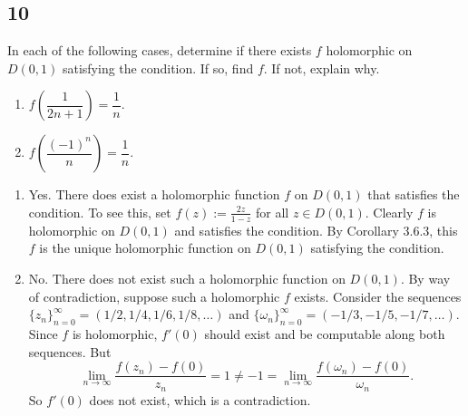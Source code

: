 \documentclass[12pt]{article}
\begin{document}
\subsection*{10}
\begin{tcolorbox}
In each of the following cases, determine if there exists $f$ holomorphic on $D(0,1)$ satisfying the condition. If so, find $f$. If not, explain why.
\begin{enumerate}[label=(\alph*),itemsep=4mm,topsep=3mm]
\item $f\left( \dfrac{1}{2n + 1} \right) = \dfrac{1}{n}$.
\item $f\left( \dfrac{(-1)^{n}}{n} \right) = \dfrac{1}{n}$.
\end{enumerate}
\end{tcolorbox}
\begin{enumerate}[label=(\alph*),itemsep=4mm,topsep=3mm]
\item Yes. There does exist a holomorphic function $f$ on $D(0,1)$ that satisfies the condition. To see this, set $f(z) := \frac{2z}{1 - z}$ for all
$z \in D(0,1)$. Clearly $f$ is holomorphic on $D(0,1)$ and satisfies the condition. By Corollary 3.6.3, this $f$ is the unique holomorphic function on
$D(0,1)$ satisfying the condition.
\item No. There does not exist such a holomorphic function on $D(0,1)$. By way of contradiction, suppose such a holomorphic $f$ exists. Consider the
sequences $\{z_{n}\}_{n=0}^{\infty} = (1/2, 1/4, 1/6, 1/8, \hdots)$ and $\{\omega_{n}\}_{n=0}^{\infty} = (-1/3, -1/5, -1/7, \hdots)$. 
Since $f$ is holomorphic, $f'(0)$ should exist and be computable along both sequences. But 
\[ \lim_{n\rightarrow\infty}\frac{f(z_{n}) - f(0)}{z_{n}} = 1 \neq -1 = \lim_{n\rightarrow\infty}\frac{f(\omega_{n}) - f(0)}{\omega_{n}}. \]
So $f'(0)$ does not exist, which is a contradiction.
\end{enumerate}
\end{document}
